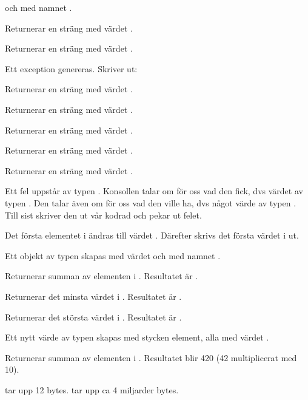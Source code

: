  och med namnet .

\SubtaskSolved  Returnerar en sträng med värdet .

\SubtaskSolved  Returnerar en sträng med värdet \code{!}.

\SubtaskSolved  Ett exception genereras. Skriver ut:


\SubtaskSolved  Returnerar en sträng med värdet .

\SubtaskSolved  Returnerar en sträng med värdet .

\SubtaskSolved  Returnerar en sträng med värdet .

\SubtaskSolved  Returnerar en sträng med värdet .

\SubtaskSolved  Returnerar en sträng med värdet .

\SubtaskSolved  Ett fel uppstår av typen . Konsollen talar om för oss vad den fick, dvs värdet  av typen . Den talar även om för oss vad den ville ha, dvs något värde av typen . Till sist skriver den ut vår kodrad och pekar ut felet.

\SubtaskSolved  Det första elementet i  ändras till värdet . Därefter skrivs det första värdet i  ut.

\SubtaskSolved  Ett objekt av typen  skapas med värdet  och med namnet .

\SubtaskSolved  Returnerar summan av elementen i . Resultatet är .

\SubtaskSolved  Returnerar det minsta värdet i . Resultatet är .

\SubtaskSolved  Returnerar det största värdet i . Resultatet är .

\SubtaskSolved  Ett nytt värde av typen  skapas med  stycken element, alla med värdet .

\SubtaskSolved  Returnerar summan av elementen i . Resultatet blir 420 (42 multiplicerat med 10).

\SubtaskSolved  {} tar upp 12 bytes.  tar upp ca 4 miljarder bytes.



\QUESTEND





